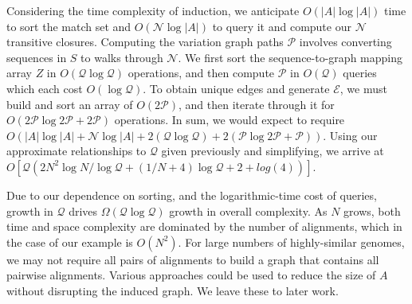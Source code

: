 \documentclass{bioinfo}
\theoremstyle{definition}
\begin{document}
Considering the time complexity of induction, we anticipate $O(|A|\log|A|)$ time to sort the match set and $O(\mathcal{N} \log |A|)$ to query it and compute our $\mathcal{N}$ transitive closures.
Computing the variation graph paths $\mathcal{P}$ involves converting sequences in $S$ to walks through $\mathcal{N}$.
We first sort the sequence-to-graph mapping array $Z$ in $O(\mathcal{Q} \log \mathcal{Q})$ operations, and then compute $\mathcal{P}$ in $O(\mathcal{Q})$ queries which each cost $O(\log \mathcal{Q})$.
To obtain unique edges and generate $\mathcal{E}$, we must build and sort an array of $O(2\mathcal{P})$, and then iterate through it for $O(2\mathcal{P} \log 2\mathcal{P} + 2\mathcal{P})$ operations.
In sum, we would expect to require $O(|A|\log|A| + \mathcal{N} \log |A| + 2(\mathcal{Q} \log \mathcal{Q}) + 2(\mathcal{P} \log 2\mathcal{P} + \mathcal{P}))$.
Using our approximate relationships to $\mathcal{Q}$ given previously and simplifying, we arrive at $O[\mathcal{Q}(2N^2 \log N / \log \mathcal{Q} + (1/N + 4)\log \mathcal{Q} + 2 + log(4))]$.

Due to our dependence on sorting, and the logarithmic-time cost of queries, growth in $\mathcal{Q}$ drives $\Omega(\mathcal{Q} \log \mathcal{Q})$ growth in overall complexity.
As $N$ grows, both time and space complexity are dominated by the number of alignments, which in the case of our example is $O(N^2)$.
For large numbers of highly-similar genomes, we may not require all pairs of alignments to build a graph that contains all pairwise alignments.
Various approaches could be used to reduce the size of $A$ without disrupting the induced graph.
We leave these to later work.



\end{document}

